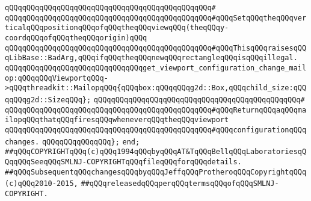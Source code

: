\verb|qQQqqQQqqQQqqQQqqQQqqQQqqQQqqQQqqQQqqQQqqQQqqQQq#|\newline
\verb|qQQqqQQqqQQqqQQqqQQqqQQqqQQqqQQqqQQqqQQqqQQqqQQq#qQQqSetqQQqtheqQQqverticalqQQqpositionqQQqofqQQqtheqQQqviewqQQq(theqQQqy-coordqQQqofqQQqtheqQQqorigin)qQQq|\newline
\verb|qQQqqQQqqQQqqQQqqQQqqQQqqQQqqQQqqQQqqQQqqQQqqQQq#qQQqThisqQQqraisesqQQqLibBase::BadArg,qQQqifqQQqtheqQQqnewqQQqrectangleqQQqisqQQqillegal.|\newline
\newline
\verb|qQQqqQQqqQQqqQQqqQQqqQQqqQQqqQQqget_viewport_configuration_change_mailop:qQQqqQQqViewportqQQq->qQQqthreadkit::MailopqQQq{qQQqbox:qQQqqQQqg2d::Box,qQQqchild_size:qQQqqQQqg2d::SizeqQQq};|\newline
\verb|qQQqqQQqqQQqqQQqqQQqqQQqqQQqqQQqqQQqqQQqqQQqqQQq#|\newline
\verb|qQQqqQQqqQQqqQQqqQQqqQQqqQQqqQQqqQQqqQQqqQQqqQQq#qQQqReturnqQQqaqQQqmailopqQQqthatqQQqfiresqQQqwheneverqQQqtheqQQqviewport|\newline
\verb|qQQqqQQqqQQqqQQqqQQqqQQqqQQqqQQqqQQqqQQqqQQqqQQq#qQQqconfigurationqQQqchanges.|\newline
\verb|qQQqqQQqqQQqqQQq};|\newline
\verb|end;|\newline
\newline
\newline
\verb|##qQQqCOPYRIGHTqQQq(c)qQQq1994qQQqbyqQQqAT&TqQQqBellqQQqLaboratoriesqQQqqQQqSeeqQQqSMLNJ-COPYRIGHTqQQqfileqQQqforqQQqdetails.|\newline
\verb|##qQQqSubsequentqQQqchangesqQQqbyqQQqJeffqQQqProtheroqQQqCopyrightqQQq(c)qQQq2010-2015,|\newline
\verb|##qQQqreleasedqQQqperqQQqtermsqQQqofqQQqSMLNJ-COPYRIGHT.|\newline

